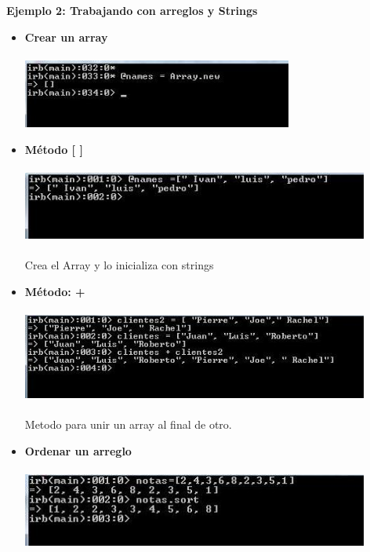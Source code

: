 \documentclass[11pt]{article} %
\begin{document}
 {\fontsize{14}{0} \bf Ejemplo 2: Trabajando con arreglos y Strings \\ }
\begin{itemize}
      \item {\bf Crear un array}\\\\
    \includegraphics[width=0.7\textwidth]{./imagenes/new_array}\\


      \item {\bf Método [ ]} \\\\
    \includegraphics[width=0.9\textwidth]{./imagenes/crear_2}\\\\
Crea el Array y lo inicializa con strings\\
      \item {\bf Método: +}\\\\
    \includegraphics[width=0.9\textwidth]{./imagenes/suma}\\\\
        Metodo para unir  un array al final de otro.

     \item {\bf Ordenar un arreglo}\\\\
    \includegraphics[width=0.9\textwidth]{./imagenes/ordenar}\\


\end{itemize}
\end{document}
